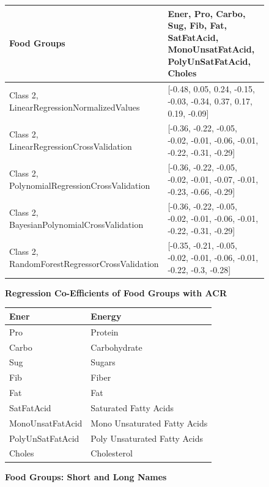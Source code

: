 \begin{figure}
\begin{tabular}{|p{4cm}|p{12cm}|}
\hline
Food Groups & Ener, Pro, Carbo, Sug, Fib, Fat, SatFatAcid, MonoUnsatFatAcid, PolyUnSatFatAcid, Choles \\
\hline
Class 2, LinearRegressionNormalizedValues & [-0.48, 0.05, 0.24, -0.15, -0.03, -0.34, 0.37, 0.17, 0.19, -0.09] \\
\hline
\hline
Class 2, LinearRegressionCrossValidation & [-0.36, -0.22, -0.05, -0.02, -0.01, -0.06, -0.01, -0.22, -0.31, -0.29] \\
\hline
Class 2, PolynomialRegressionCrossValidation & [-0.36, -0.22, -0.05, -0.02, -0.01, -0.07, -0.01, -0.23, -0.66, -0.29] \\
\hline
Class 2, BayesianPolynomialCrossValidation & [-0.36, -0.22, -0.05, -0.02, -0.01, -0.06, -0.01, -0.22, -0.31, -0.29] \\
\hline
Class 2, RandomForestRegressorCrossValidation & [-0.35, -0.21, -0.05, -0.02, -0.01, -0.06, -0.01, -0.22, -0.3, -0.28] \\
\hline
\end{tabular}
\caption{\textbf{Regression Co-Efficients of Food Groups with ACR}}
\label{reg-coef-food-acr}
\vspace{0.25cm}
\end{figure}

\begin{footnotesize}
\begin{figure}
\begin{tabular}{|p{4cm}|p{6cm}|}
\hline
Ener & Energy \\
\hline
Pro & Protein \\
Carbo & Carbohydrate \\
\hline
Sug & Sugars \\
\hline
Fib & Fiber \\
\hline
Fat & Fat \\
\hline
SatFatAcid & Saturated Fatty Acids \\
\hline
MonoUnsatFatAcid & Mono Unsaturated Fatty Acids \\
\hline
PolyUnSatFatAcid & Poly Unsaturated Fatty Acids \\
\hline
Choles & Cholesterol \\
\hline

\end{tabular}
\caption{\textbf{Food Groups: Short and Long Names}}
\label{food-groups-abbr}
\vspace{0.25cm}
\end{figure}

\end{footnotesize}

